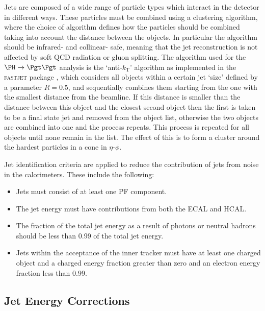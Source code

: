 Jets are composed of a wide range of particle types which interact in the
detector in different ways. These particles must be combined using a clustering
algorithm, where the choice of algorithm defines how the particles should be combined
taking into account the distance between the objects. In particular the
algorithm should be infrared- and collinear- safe, meaning that the jet
reconstruction is not affected by soft \ac{QCD} radiation or gluon splitting.
The algorithm used for the $\PH\to\Pgt\Pgt$ analysis is the `anti-$k_{\text{T}}$' algorithm as implemented in
the \textsc{fastjet} package \cite{Cacciari:fastjet1}, which considers all 
objects within a certain jet `size' defined by a parameter $R=0.5$, and 
sequentially combines them starting from the one with the
smallest distance from the beamline. If this distance is smaller than the
distance between this object and the closest second object then the first is
taken to be a final state jet and removed from the object list,
otherwise the two objects are combined into one and the process repeats. 
This process is repeated for all objects until none remain in the list. The effect of this
is to form a cluster around the hardest particles in a cone in $\eta$-$\phi$.

Jet identification criteria are applied to reduce the contribution of jets from
noise in the calorimeters. These include the following:
\begin{itemize}
\item Jets must consist of at least one \ac{PF} component. 
\item The jet energy must have contributions
from both the \ac{ECAL} and \ac{HCAL}.
\item The fraction of the total jet energy as a result of photons or neutral
hadrons should be less than 0.99 of the total jet energy.
\item Jets within the acceptance of the inner tracker must have at least one
charged object and a charged energy fraction greater than zero and an electron
energy fraction less than 0.99. 
\end{itemize}

\subsection{Jet Energy Corrections}
\label{sec:JEC}

